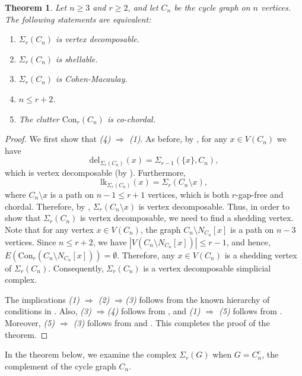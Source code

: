 \documentclass[12pt,reqno]{amsart}
\newtheorem{theorem}[proposition]{Theorem}
\theoremstyle{definition}
\newcommand{\lk}{{\mathrm{lk}}}
\newcommand{\del}{{\mathrm{del}}}
\newcommand{\Con}{{\mathrm{Con}}}
\def\del{\mathrm{del}}
\begin{document}
	\begin{theorem}\label{cycle vd theorem} 
		Let $n \geq 3$ and $r\geq 2$, and let $C_n$ be the cycle graph on $n$ vertices. The following statements are equivalent:
		\begin{enumerate}        
			\item $\Sigma_r(C_n)$ is vertex decomposable.
			\item $\Sigma_r(C_n)$ is shellable.
			\item $\Sigma_r(C_n)$ is Cohen-Macaulay.
			\item $n \leq r+2$.
			\item The clutter $\Con_r(C_n)$ is co-chordal.
		\end{enumerate}
	\end{theorem}
	\begin{proof}
		We first show that \emph{(4) $\Rightarrow$ (1)}. As before, by , for any $x\in V(C_n)$ we have  
        \[
        \del_{\Sigma_r(C_n)}(x) = \Sigma_{r-1}(\{x\},C_n),
        \]
        which is vertex decomposable (by ). Furthermore, 
    \[\lk_{\Sigma_r(C_n)}(x) = \Sigma_r(C_n\setminus x),
    \]
    where $C_n \setminus x$ is a path on $n - 1 \leq r + 1$ vertices, which is both $r$-gap-free and chordal. Therefore, by , $\Sigma_r(C_n \setminus x)$ is vertex decomposable. Thus, in order to show that $\Sigma_r(C_n)$ is vertex decomposable, we need to find a shedding vertex. Note that for any vertex $x \in V(C_n)$, the graph $C_n \setminus N_{C_n}[x]$ is a path on $n-3$ vertices. Since $n \leq r+2$, we have
		$|V(C_n \setminus N_{C_n}[x])|\leq r - 1$, and hence, $E(\Con_r(C_n \setminus N_{C_n}[x])) = \emptyset$. Therefore, any $x\in V(C_n)$ is a shedding vertex of $\Sigma_{r}(C_n)$. Consequently, $\Sigma_r(C_n)$ is a vertex decomposable simplicial complex. 
		
		The implications \emph{(1) $\Rightarrow$ (2) $\Rightarrow$(3)} follows from the known hierarchy of conditions in . Also, \emph{(3) $\Rightarrow$(4)} follows from , and \emph{(1) $\Rightarrow$ (5)} follows from . Moreover, \emph{(5) $\Rightarrow$ (3)} follows from \cite[Theorem 3.3]{SBCC} and \cite[Theorem 3]{EagonReiner1998}. This completes the proof of the theorem.
	\end{proof}

In the theorem below, we examine the complex $\Sigma_r(G)$ when $G = C_n^c$, the complement of the cycle graph $C_n$.
    
\end{document}
